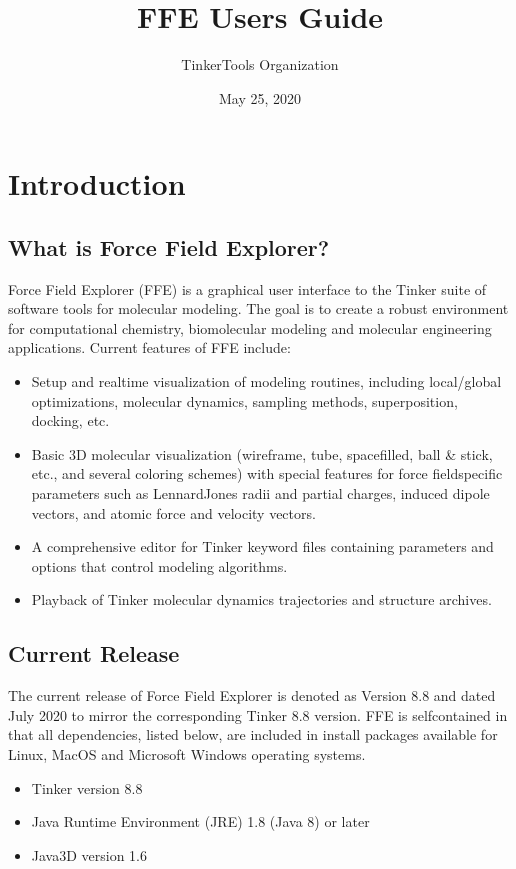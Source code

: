 \documentclass[letterpaper,11pt,english]{sphinxmanual}
\title{FFE User\textquotesingle{}s Guide}
\date{May 25, 2020}
\author{TinkerTools Organization}
\begin{document}
\pagestyle{empty}
\sphinxmaketitle
\pagestyle{plain}
\sphinxtableofcontents
\pagestyle{normal}
\label{\detokenize{index::doc}}



\chapter{Introduction}
\label{\detokenize{text/introduction:introduction}}\label{\detokenize{text/introduction::doc}}

\section{What is Force Field Explorer?}
\label{\detokenize{text/introduction:what-is-force-field-explorer}}
Force Field Explorer (FFE) is a graphical user interface to the Tinker suite of software tools for molecular modeling. The goal is to create a robust environment for computational chemistry, biomolecular modeling and molecular engineering applications. Current features of FFE include:
\begin{itemize}
\item {} 
Setup and real\sphinxhyphen{}time visualization of modeling routines, including local/global optimizations, molecular dynamics, sampling methods, superposition, docking, etc.

\item {} 
Basic 3D molecular visualization (wireframe, tube, spacefilled, ball \& stick, etc., and several coloring schemes) with special features for force field\sphinxhyphen{}specific parameters such as Lennard\sphinxhyphen{}Jones radii and partial charges, induced dipole vectors, and atomic force and velocity vectors.

\item {} 
A comprehensive editor for Tinker keyword files containing parameters and options that control modeling algorithms.

\item {} 
Playback of Tinker molecular dynamics trajectories and structure archives.

\end{itemize}


\section{Current Release}
\label{\detokenize{text/introduction:current-release}}
The current release of Force Field Explorer is denoted as Version 8.8 and dated July 2020 to mirror the corresponding Tinker 8.8 version. FFE is self\sphinxhyphen{}contained in that all dependencies, listed below, are included in install packages available for Linux, MacOS and Microsoft Windows operating systems.
\begin{itemize}
\item {} 
Tinker version 8.8

\item {} 
Java Runtime Environment (JRE) 1.8 (Java 8) or later

\item {} 
Java3D version 1.6

\end{itemize}
\end{document}
